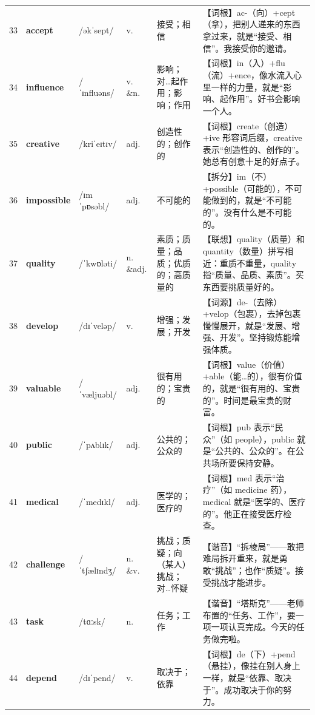 \documentclass[UTF8,a4paper,11pt,oneside]{ctexbook}
\newcommand{\cellword}[1]{{\bfseries\textcolor{wordcol}{#1}}}
\newcommand{\cellipa}[1]{{\footnotesize\textcolor{ipacol}{#1}}}
\newcommand{\cellpos}[1]{\textcolor{poscol}{#1}}
\newcommand{\cellno}[1]{\textcolor{volcolor!75!black}{#1}}
\begin{document}
{\begin{longtable}{@{}C{0.045\textwidth}L{0.155\textwidth}L{0.175\textwidth}C{0.070\textwidth}L{0.180\textwidth}L{0.282\textwidth}@{}}
 \cellno{33} & \cellword{accept} & \cellipa{/əkˈsept/} & \cellpos{v.} & 接受；相信 & \textcolor{tagRoot}{【词根】}ac-（向）+cept（拿），把别人递来的东西拿过来，就是“接受、相信”。我接受你的邀请。 \\
\cellno{34} & \cellword{influence} & \cellipa{/ˈɪnfluəns/} & \cellpos{v. \&n.} & 影响；对…起作用；影响；作用 & \textcolor{tagRoot}{【词根】}in（入）+flu（流）+ence，像水流入心里一样的力量，就是“影响、起作用”。好书会影响一个人。 \\
 \cellno{35} & \cellword{creative} & \cellipa{/kriˈeɪtɪv/} & \cellpos{adj.} & 创造性的；创作的 & \textcolor{tagRoot}{【词根】}create（创造）+ive 形容词后缀，creative 表示“创造性的、创作的”。她总有创意十足的好点子。 \\
\cellno{36} & \cellword{impossible} & \cellipa{/ɪmˈpɒsəbl/} & \cellpos{adj.} & 不可能的 & \textcolor{tagSplit}{【拆分】}im（不）+possible（可能的），不可能做到的，就是“不可能的”。没有什么是不可能的。 \\
 \cellno{37} & \cellword{quality} & \cellipa{/ˈkwɒləti/} & \cellpos{n. \&adj.} & 素质；质量；品质；优质的；高质量的 & \textcolor{tagAssoc}{【联想】}quality（质量）和 quantity（数量）拼写相近：重质不重量，quality 指“质量、品质、素质”。买东西要挑质量好的。 \\
\cellno{38} & \cellword{develop} & \cellipa{/dɪˈveləp/} & \cellpos{v.} & 增强；发展；开发 & \textcolor{tagEtym}{【词源】}de-（去除）+velop（包裹），去掉包裹慢慢展开，就是“发展、增强、开发”。坚持锻炼能增强体质。 \\
 \cellno{39} & \cellword{valuable} & \cellipa{/ˈvæljuəbl/} & \cellpos{adj.} & 很有用的；宝贵的 & \textcolor{tagRoot}{【词根】}value（价值）+able（能…的），很有价值的，就是“很有用的、宝贵的”。时间是最宝贵的财富。 \\
\cellno{40} & \cellword{public} & \cellipa{/ˈpʌblɪk/} & \cellpos{adj.} & 公共的；公众的 & \textcolor{tagRoot}{【词根】}pub 表示“民众”（如 people），public 就是“公共的、公众的”。在公共场所要保持安静。 \\
 \cellno{41} & \cellword{medical} & \cellipa{/ˈmedɪkl/} & \cellpos{adj.} & 医学的；医疗的 & \textcolor{tagRoot}{【词根】}med 表示“治疗”（如 medicine 药），medical 就是“医学的、医疗的”。他正在接受医疗检查。 \\
\cellno{42} & \cellword{challenge} & \cellipa{/ˈtʃælɪndʒ/} & \cellpos{n. \&v.} & 挑战；质疑；向（某人）挑战；对…怀疑 & \textcolor{tagSound}{【谐音】}“拆棱局”——敢把难局拆开重来，就是勇敢“挑战”；也作“质疑”。接受挑战才能进步。 \\
 \cellno{43} & \cellword{task} & \cellipa{/tɑːsk/} & \cellpos{n.} & 任务；工作 & \textcolor{tagSound}{【谐音】}“塔斯克”——老师布置的“任务、工作”，要一项一项认真完成。今天的任务做完啦。 \\
\cellno{44} & \cellword{depend} & \cellipa{/dɪˈpend/} & \cellpos{v.} & 取决于；依靠 & \textcolor{tagRoot}{【词根】}de（下）+pend（悬挂），像挂在别人身上一样，就是“依靠、取决于”。成功取决于你的努力。 \\
\end{longtable}
}
\end{document}
